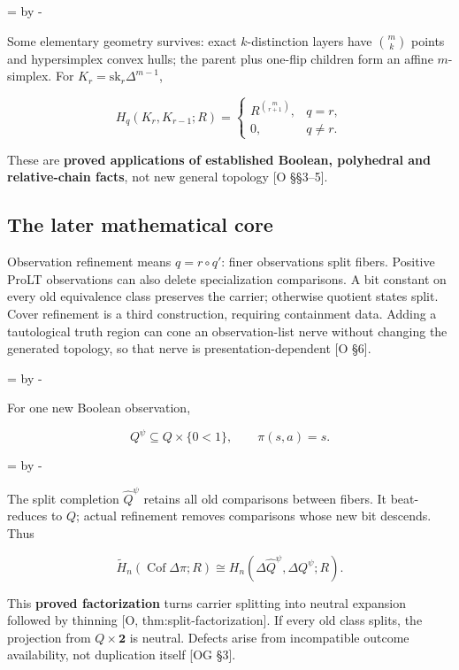 \documentclass[10pt,letterpaper]{article}
\newcommand{\NeedDisplaySpace}{\par\begingroup\dimen0=\pagegoal\advance\dimen0 by -\pagetotal\ifdim\dimen0<8\baselineskip\newpage\fi\endgroup}
\begin{document}
\NeedDisplaySpace
\begin{samepage}
Some elementary geometry survives: exact \(k\)-distinction layers have \(\binom mk\) points and hypersimplex convex hulls; the parent plus one-flip children form an affine \(m\)-simplex. For \(K_r=\mathrm{sk}_r\Delta^{m-1}\),\par
\[
H_q(K_r,K_{r-1};R)=
\begin{cases}R^{\binom m{r+1}},&q=r,\\0,&q\ne r.\end{cases}
\]
\end{samepage}
These are \textbf{proved applications of established Boolean, polyhedral and relative-chain facts}, not new general topology [O \S{}\S{}3--5].\par

\subsection*{The later mathematical core}

Observation refinement means \(q=r\circ q'\): finer observations split fibers. Positive ProLT observations can also delete specialization comparisons. A bit constant on every old equivalence class preserves the carrier; otherwise quotient states split. Cover refinement is a third construction, requiring containment data. Adding a tautological truth region can cone an observation-list nerve without changing the generated topology, so that nerve is presentation-dependent [O \S{}6].\par

\NeedDisplaySpace
\begin{samepage}
For one new Boolean observation,\par
\[
Q^\psi\subseteq Q\times\{0<1\},\qquad \pi(s,a)=s.
\]
\end{samepage}
\NeedDisplaySpace
\begin{samepage}
The split completion \(\widehat Q^\psi\) retains all old comparisons between fibers. It beat-reduces to \(Q\); actual refinement removes comparisons whose new bit descends. Thus\par
\[
\widetilde H_n(\operatorname{Cof}\Delta\pi;R)
\cong H_n(\Delta\widehat Q^\psi,\Delta Q^\psi;R).
\]
\end{samepage}
This \textbf{proved factorization} turns carrier splitting into neutral expansion followed by thinning [O, thm:split-factorization]. If every old class splits, the projection from \(Q\times\mathbf2\) is neutral. Defects arise from incompatible outcome availability, not duplication itself [OG \S{}3].\par
\end{document}
